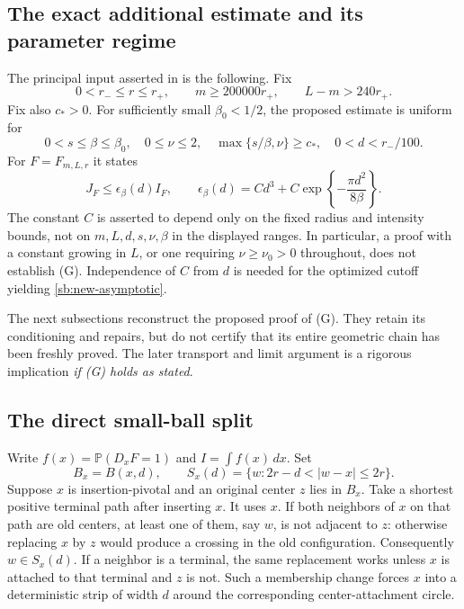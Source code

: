 \documentclass[11pt,a4paper]{article}
\theoremstyle{definition}
\theoremstyle{remark}
\numberwithin{equation}{section}
\begin{document}
\subsection{The exact additional estimate and its parameter regime}

The principal input asserted in  is
the following. Fix
\begin{equation}
 0<r_-\le r\le r_+,\qquad
 m\ge200000r_+,\qquad L-m>240r_+.
 \label{sb:geometry-regime}
\end{equation}
Fix also $c_*>0$. For sufficiently small $\beta_0<1/2$, the proposed
estimate is uniform for
\begin{equation}
 0<s\le\beta\le\beta_0,\quad 0\le\nu\le2,
 \quad \max\{s/\beta,\nu\}\ge c_*,
 \quad 0<d<r_-/100.
 \label{sb:parameter-regime}
\end{equation}
For $F=F_{m,L,r}$ it states
\begin{equation}
 J_F\le\epsilon_\beta(d)I_F,
 \qquad
 \epsilon_\beta(d)=C d^3+C\exp\left\{-\frac{\pi d^2}{8\beta}\right\}.
 \tag{G}\label{sb:geometric-claim}
\end{equation}
The constant $C$ is asserted to depend only on the fixed radius and
intensity bounds, not on $m,L,d,s,\nu,\beta$ in the displayed ranges.
In particular, a proof with a constant growing in $L$, or one requiring
$\nu\ge\nu_0>0$ throughout, does not establish (G). Independence of
$C$ from $d$ is needed for the optimized cutoff yielding
\eqref{sb:new-asymptotic}.

The next subsections reconstruct the proposed proof of (G). They retain
its conditioning and repairs, but do not certify that its entire
geometric chain has been freshly proved. The later transport and limit
argument is a rigorous implication \emph{if (G) holds as stated}.

\subsection{The direct small-ball split}

Write $f(x)=\mathbb P(D_xF=1)$ and $I=\int f(x)\,dx$. Set
\[
 B_x=B(x,d),\qquad
 S_x(d)=\{w:2r-d<|w-x|\le2r\}.
\]
Suppose $x$ is insertion-pivotal and an original center $z$ lies in
$B_x$. Take a shortest positive terminal path after inserting $x$.
It uses $x$. If both neighbors of $x$ on that path are old centers,
at least one of them, say $w$, is not adjacent to $z$: otherwise
replacing $x$ by $z$ would produce a crossing in the old configuration.
Consequently $w\in S_x(d)$. If a neighbor is a terminal, the same
replacement works unless $x$ is attached to that terminal and $z$ is
not. Such a membership change forces $x$ into a deterministic strip of
width $d$ around the corresponding center-attachment circle.
\end{document}
